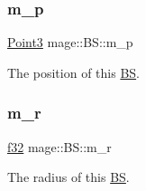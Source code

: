 \subsubsection{\texorpdfstring{m\+\_\+p}{m\_p}}
{\footnotesize\ttfamily \hyperlink{structmage_1_1_point3}{Point3} mage\+::\+B\+S\+::m\+\_\+p}

The position of this \hyperlink{structmage_1_1_b_s}{BS}. \hypertarget{structmage_1_1_b_s_a63a16fbfb4ff89697db2c0a8f976a3ce}{}\label{structmage_1_1_b_s_a63a16fbfb4ff89697db2c0a8f976a3ce} 
\subsubsection{\texorpdfstring{m\+\_\+r}{m\_r}}
{\footnotesize\ttfamily \hyperlink{namespacemage_a6a44ad388483959dc4dff9f2aef91431}{f32} mage\+::\+B\+S\+::m\+\_\+r}

The radius of this \hyperlink{structmage_1_1_b_s}{BS}. 
